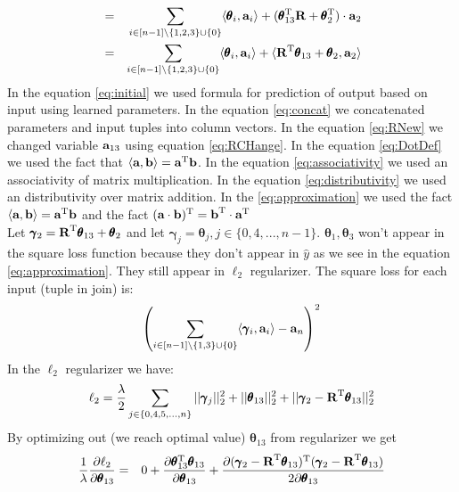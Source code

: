 \documentclass[10pt,a4paper]{article}
\begin{document}
\begin{enumerate}
\begin{eqnarray}
&=&
\sum_{ i\in [n-1] \setminus \{ 1, 2,3 \}\cup \{0\}} \langle \pmb{\theta}_i, \textbf{\text{{a}}}_i \rangle + (\pmb{\theta}_{13} ^ \text{T} \textbf{\text{{R}}}+ \pmb{\theta}_2  ^ \text{T})\cdot \textbf{\text{{a}}}_2  \label{eq:distributivity} \\
&=&
\sum_{ i\in [n-1]\setminus \{ 1, 2,3 \} \cup \{0\}} \langle \pmb{\theta}_i, \textbf{\text{{a}}}_i \rangle +   \langle \textbf{\text{{R}}} ^ \text{T} \pmb{\theta}_{13} +\pmb{\theta}_2 ,\textbf{\text{{a}}}_2 \rangle  \label{eq:approximation}
\end{eqnarray}
In the equation \ref{eq:initial} we used formula for prediction of output based on input using learned parameters. In the equation \ref{eq:concat} we concatenated parameters and input tuples into column vectors. In the equation \ref{eq:RNew} we changed variable $\textbf{\text{{a}}}_{13}$ using equation \ref{eq:RCHange}. 
In the equation \ref{eq:DotDef} we used the fact that $\langle \textbf{\text{{a}}}, \textbf{\text{{b}}} \rangle = \textbf{\text{{a}}} ^ \text{T} \textbf{\text{{b}}}$. In the equation \ref{eq:associativity} we used an associativity of matrix multiplication. In the equation \ref{eq:distributivity} we used an distributivity over matrix addition. In the \ref{eq:approximation} we used the fact  $\langle \textbf{\text{{a}}}, \textbf{\text{{b}}} \rangle = \textbf{\text{{a}}} ^ \text{T} \textbf{\text{{b}}}$ and the fact  $(\textbf{\text{{a}}} \cdot \textbf{\text{{b}}}) ^ \text{T} = \textbf{\text{{b}}} ^ \text{T} \cdot \textbf{\text{{a}}} ^ \text{T}$
\\
Let $\pmb{\gamma}_2 = \textbf{\text{{R}}} ^ \text{T}\pmb{\theta}_{13} + \pmb{\theta}_2$ and let $\pmb{\gamma}_j = \pmb{\theta}_j, j \in \{0, 4, ..., n-1\}$. $\pmb{\theta}_1, \pmb{\theta}_3$ won't appear in the square loss function because they don't appear in $\hat{y}$ as we see in the equation \ref{eq:approximation}. They still appear in $\ell_2$ regularizer. The square loss for each input (tuple in join) is:
$$
\left(\sum_{ i\in [n-1]\setminus \{  1,3 \} \cup \{0\}} \langle \pmb{\gamma}_i, \textbf{\text{{a}}}_i \rangle - \textbf{\text{{a}}}_n\right)^2 \label{eq:approximation}
$$
In the $\ell_2$ regularizer we have:
$$\ell_2 = \frac{\lambda}{2} \sum_{j \in \{0, 4, 5, ..., n \} } ||\pmb{\gamma}_j||_2^2 + ||\pmb{\theta}_{13} ||^2_2 +  ||\pmb{\gamma}_2 - \textbf{\text{{R}}} ^ \text{T}\pmb{\theta}_{13}  ||_2^2$$
By optimizing out (we reach optimal value) $\pmb{\theta}_{13}$ from regularizer we get 
\begin{align}
\frac{1}{\lambda} \frac{\partial \ell_2}{\partial \pmb{\theta}_{13}} &=&
0 + 
\frac{\partial \transpose{\pmb{\theta}_{13}}\pmb{\theta}_{13}}{\partial \pmb{\theta}_{13}} + 
\frac{\partial \transpose{(\pmb{\gamma}_2 - 
\transpose{\mat{R}}\pmb{\theta}_{13})}(\pmb{\gamma}_2 - \transpose{\mat{R}}\pmb{\theta}_{13})}{2\partial \pmb{\theta}_{13}} \label{eq:simpleExp}\\

\end{align}
\end{enumerate}
\end{document}
